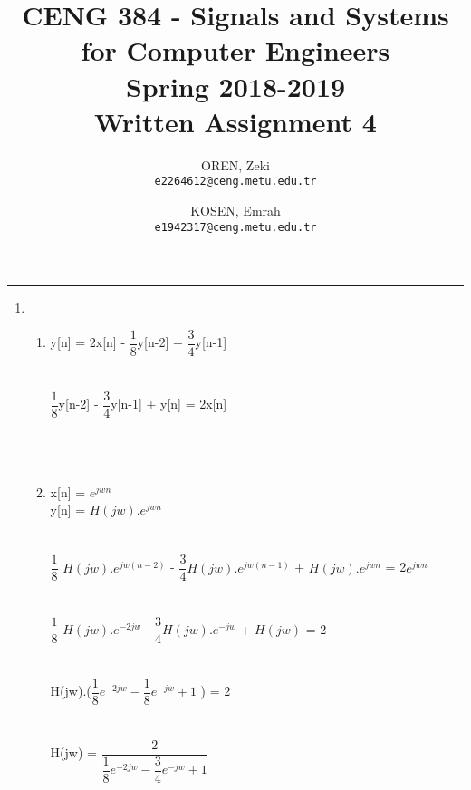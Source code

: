 \documentclass[10pt,a4paper, margin=1in]{article}
\author{
  OREN, Zeki\\
  \texttt{e2264612@ceng.metu.edu.tr}
  \and
  KOSEN, Emrah\\
  \texttt{e1942317@ceng.metu.edu.tr}
}
\title{CENG 384 - Signals and Systems for Computer Engineers \\
Spring 2018-2019 \\
Written Assignment 4}
\begin{document}
\maketitle



\noindent\rule{19cm}{1.2pt}

\begin{enumerate}

\item 
    \begin{enumerate}
    \item %
    
    
    y[n] = 2x[n] - $\dfrac{1}{8}$y[n-2] + $\dfrac{3}{4}$y[n-1]\\\\\\
    $\dfrac{1}{8}$y[n-2] - $\dfrac{3}{4}$y[n-1] + y[n]  = 2x[n] \\\\\\\\
   
   \item %
   
    x[n] = $e^{jwn}$\\
    
     y[n] = $H(jw).e^{jwn}$\\\\\\
      $\dfrac{1}{8}$ $H(jw).e^{jw(n-2)}$ - $\dfrac{3}{4}H(jw).e^{jw(n-1)}$ + $H(jw).e^{jwn}$  = 2$e^{jwn}$ \\\\\\
      $\dfrac{1}{8}$ $H(jw).e^{-2jw}$ - $\dfrac{3}{4}H(jw).e^{-jw}$ + $H(jw)$  = 2 \\\\\\
       H(jw).($\dfrac{1}{8}e^{-2jw} - \dfrac{1}{8}e^{-jw} + 1$ )   = 2 \\\\\\
        H(jw) = $\dfrac{2}{\dfrac{1}{8}e^{-2jw} - \dfrac{3}{4}e^{-jw} + 1} $  \\\\\\\\
       
      
    
    
    
    
    

\end{enumerate}
\end{enumerate}
\end{document}
